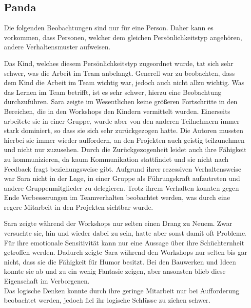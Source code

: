 \subsection{Panda}
Die folgenden Beobachtungen sind nur für eine Person. Daher kann es vorkommen, dass Personen, welcher dem gleichen Persönlichkeitstyp angehören, andere Verhaltensmuster aufweisen.

Das Kind, welches diesem Persönlichkeitstyp zugeordnet wurde, tat sich sehr schwer, was die Arbeit im Team anbelangt. Generell war zu beobachten, dass dem Kind die Arbeit im Team wichtig war, jedoch auch nicht allzu wichtig. Was das Lernen im Team betrifft, ist es sehr schwer, hierzu eine Beobachtung durchzuführen. Sara zeigte im Wesentlichen keine größeren Fortschritte in den Bereichen, die in den Workshops den Kindern vermittelt wurden. Einerseits arbeitete sie in einer Gruppe, wurde aber von den anderen Teilnehmern immer stark dominiert, so dass sie sich sehr zurückgezogen hatte. Die Autoren mussten hierbei sie immer wieder auffordern, an den Projekten auch geistig teilzunehmen und nicht nur zuzusehen. Durch die Zurückgezogenheit leidet auch ihre Fähigkeit zu kommunizieren, da kaum Kommunikation stattfindet und sie nicht nach Feedback fragt beziehungsweise gibt. Aufgrund ihrer rezessiven Verhaltensweise war Sara nicht in der Lage, in einer Gruppe als Führungskraft aufzutreten und andere Gruppenmitglieder zu delegieren. Trotz ihrem Verhalten konnten gegen Ende Verbesserungen im Teamverhalten beobachtet werden, was durch eine regere Mitarbeit in den Projekten sichtbar wurde.

Sara zeigte während der Workshops nur selten einen Drang zu Neuem. Zwar versuchte sie, hin und wieder dabei zu sein, hatte aber sonst damit oft Probleme. Für ihre emotionale Sensitivität kann nur eine Aussage über ihre Schüchternheit getroffen werden. Dadurch zeigte Sara während den Workshops nur selten bis gar nicht, dass sie die Fähigkeit für Humor besitzt. Bei den Bauwerken und Ideen konnte sie ab und zu ein wenig Fantasie zeigen, aber ansonsten blieb diese Eigenschaft im Verborgenen.\\
Das logische Denken konnte durch ihre geringe Mitarbeit nur bei Aufforderung beobachtet werden, jedoch fiel ihr logische Schlüsse zu ziehen schwer.

